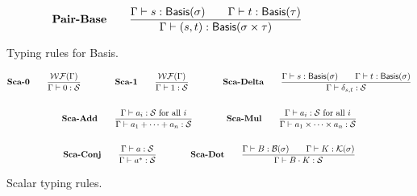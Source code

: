 \documentclass{article}
\begin{document}
\begin{figure}[h]
    \begin{gather*}
        \textbf{Pair-Base} \qquad
        \frac{
            \Gamma\vdash s : \mathsf{Basis}(\sigma) \qquad \Gamma\vdash t : \mathsf{Basis}(\tau)} {\Gamma\vdash (s, t) : \mathsf{Basis}(\sigma \times \tau)} 
        \textbf{}
    \end{gather*}
    \caption{Typing rules for Basis. }
\end{figure}

\begin{figure}[h]
    \begin{gather*}
        \textbf{Sca-0} \qquad
        \frac{\mathcal{WF}(\Gamma)}{\Gamma \vdash 0 : \mathcal{S}}
        \qquad \qquad
        \textbf{Sca-1} \qquad
        \frac{\mathcal{WF}(\Gamma)}{\Gamma \vdash 1 : \mathcal{S}}
        \qquad \qquad
        \textbf{Sca-Delta} \qquad
        \frac{ \Gamma\vdash s : \mathsf{Basis}(\sigma) \qquad \Gamma\vdash t : \mathsf{Basis}(\sigma) } {\Gamma \vdash \delta_{s, t} : \mathcal{S}} \\
        \\
        \textbf{Sca-Add} \qquad
        \frac{\Gamma\vdash a_i : \mathcal{S} \text{ for all $i$}}{\Gamma\vdash a_1 + \cdots + a_n : \mathcal{S}}
        \qquad \qquad
        \textbf{Sca-Mul} \qquad
        \frac{\Gamma\vdash a_i : \mathcal{S} \text{ for all $i$}}{\Gamma\vdash a_1 \times \cdots \times a_n : \mathcal{S}} \\
        \\
        \textbf{Sca-Conj} \qquad
        \frac{\Gamma \vdash a : \mathcal{S}}{\Gamma \vdash a^*:\mathcal{S}}
        \qquad \qquad
        \textbf{Sca-Dot} \qquad
        \frac{\Gamma\vdash B : \mathcal{B}(\sigma) \qquad \Gamma\vdash K : \mathcal{K}(\sigma)}{\Gamma \vdash B \cdot K : \mathcal{S}}
    \end{gather*}
    \caption{Scalar typing rules.}
\end{figure}
\end{document}

